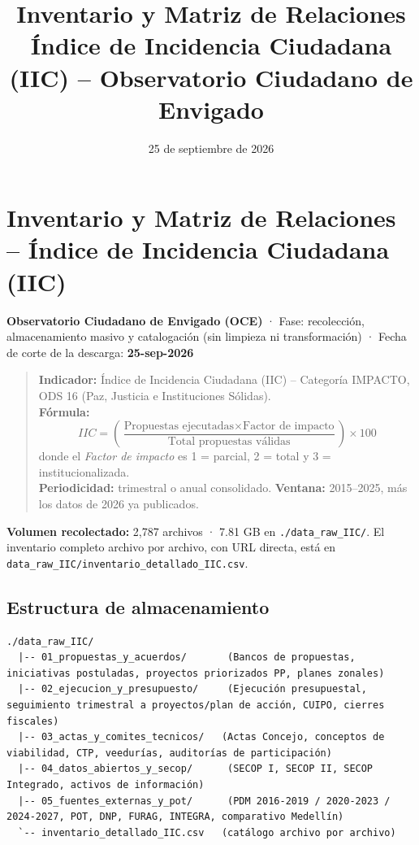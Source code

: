 \documentclass[11pt,a4paper]{article}
\title{Inventario y Matriz de Relaciones\\\large Índice de Incidencia Ciudadana (IIC) -- Observatorio Ciudadano de Envigado}
\date{25 de septiembre de 2026}
\begin{document}
\section*{Inventario y Matriz de Relaciones – Índice de Incidencia Ciudadana (IIC)}

\textbf{Observatorio Ciudadano de Envigado (OCE)} · Fase: recolección, almacenamiento masivo y catalogación (sin limpieza ni transformación) · Fecha de corte de la descarga: \textbf{25-sep-2026}

\begin{quote}
\textbf{Indicador:} Índice de Incidencia Ciudadana (IIC) – Categoría IMPACTO, ODS 16 (Paz, Justicia e Instituciones Sólidas).\\
\textbf{Fórmula:}
\begin{equation*}
IIC = \left( \frac{\text{Propuestas ejecutadas} \times \text{Factor de impacto}}{\text{Total propuestas válidas}} \right) \times 100
\end{equation*}
donde el \emph{Factor de impacto} es 1 = parcial, 2 = total y 3 = institucionalizada.\\
\textbf{Periodicidad:} trimestral o anual consolidado. \textbf{Ventana:} 2015–2025, más los datos de 2026 ya publicados.\\
\end{quote}

\textbf{Volumen recolectado:} 2,787 archivos · 7.81 GB en \texttt{.\allowbreak{}/\allowbreak{}data\_\allowbreak{}raw\_\allowbreak{}IIC/\allowbreak{}}. El inventario completo archivo por archivo, con URL directa, está en \texttt{data\_\allowbreak{}raw\_\allowbreak{}IIC/\allowbreak{}inventario\_\allowbreak{}detallado\_\allowbreak{}IIC.\allowbreak{}csv}.

\subsection*{Estructura de almacenamiento}

\begin{verbatim}
./data_raw_IIC/
  |-- 01_propuestas_y_acuerdos/       (Bancos de propuestas, iniciativas postuladas, proyectos priorizados PP, planes zonales)
  |-- 02_ejecucion_y_presupuesto/     (Ejecución presupuestal, seguimiento trimestral a proyectos/plan de acción, CUIPO, cierres fiscales)
  |-- 03_actas_y_comites_tecnicos/   (Actas Concejo, conceptos de viabilidad, CTP, veedurías, auditorías de participación)
  |-- 04_datos_abiertos_y_secop/      (SECOP I, SECOP II, SECOP Integrado, activos de información)
  |-- 05_fuentes_externas_y_pot/      (PDM 2016-2019 / 2020-2023 / 2024-2027, POT, DNP, FURAG, INTEGRA, comparativo Medellín)
  `-- inventario_detallado_IIC.csv   (catálogo archivo por archivo)
\end{verbatim}
\end{document}

